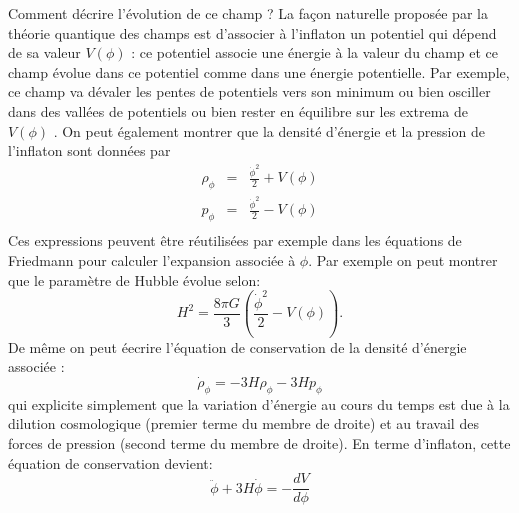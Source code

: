 Comment décrire l'évolution de ce champ ? La façon naturelle proposée par la théorie quantique des champs est d'associer à l'inflaton un potentiel qui dépend de sa valeur $V(\phi)$ : ce potentiel associe une énergie à la valeur du champ et ce champ évolue dans ce potentiel comme dans une énergie potentielle. Par exemple, ce champ va dévaler les pentes de potentiels vers son minimum ou bien osciller dans des vallées de potentiels ou bien rester en équilibre sur les extrema de $V(\phi)$ . On peut également montrer que la densité d'énergie et la pression de l'inflaton sont données par  
\begin{eqnarray}
\rho_\phi&=&\frac{\dot \phi^2}{2}+V(\phi)\\
p_\phi&=&\frac{\dot \phi^2}{2}-V(\phi)\\
\end{eqnarray}
Ces expressions peuvent être réutilisées par exemple dans les équations de Friedmann pour calculer l'expansion associée à $\phi$. Par exemple on peut montrer que le paramètre de Hubble évolue selon:
\begin{equation}
H^2=\frac{8\pi G}{3}\left(\frac{\dot \phi^2}{2}-V(\phi)\right).
\label{e:hubbleinf}
\end{equation}
De même on peut éecrire l'équation de conservation de la densité d'énergie associée :
\begin{equation}
\dot \rho_\phi= -3H\rho_\phi-3Hp_\phi
\end{equation}
qui explicite simplement que la variation d'énergie au cours du temps est due à la dilution cosmologique (premier terme du membre de droite) et au travail des forces de pression (second terme du membre de droite). En terme d'inflaton, cette équation de conservation devient:
\begin{equation}
\ddot \phi+ 3H \dot \phi = -\frac{d V}{d\phi}
\end{equation}


